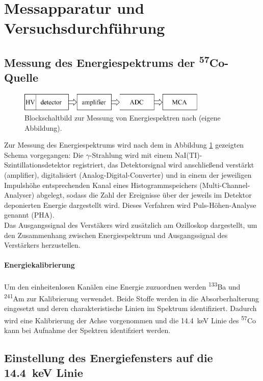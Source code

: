\documentclass[a4paper,twoside,final]{article}
\begin{document}
\section{Messapparatur und Versuchsdurchführung} \label{sec:Versuchsdurchführung}
\subsection{Messung des Energiespektrums der \textsuperscript{57}Co-Quelle}
\begin{figure}[htp]
    \centering
    \includegraphics[width=0.8\textwidth]{Schaltungen/Blockschaltbild_Energiespektren.pdf}
    \caption{Blockschaltbild zur Messung von Energiespektren nach \cite{Reisloehner} (eigene Abbildung).}
    \label{fig:BlockEnergiespektren}
\end{figure}
Zur Messung des Energiespektrums wird nach dem in Abbildung \ref{fig:BlockEnergiespektren} gezeigten Schema vorgegangen: Die $\gamma$-Strahlung wird mit einem NaI(TI)-Szintillationsdetektor registriert, das Detektorsignal wird anschließend verstärkt (amplifier), digitalisiert (Analog-Digital-Converter) und in einem der jeweiligen Impulshöhe entsprechenden Kanal eines Histogrammspeichers (Multi-Channel-Analyser) abgelegt, sodass die Zahl der Ereignisse über der jeweils im Detektor deponierten Energie dargestellt wird. Dieses Verfahren wird Puls-Höhen-Analyse genannt (PHA). \\
Das Ausgangssignal des Verstäkers wird zusätzlich am Ozilloskop dargestellt, um den Zusammenhang zwischen Energiespektrum und Ausgangssignal des Verstärkers herzustellen.
\paragraph{Energiekalibrierung}
Um den einheitenlosen Kanälen eine Energie zuzuordnen werden \textsuperscript{133}Ba und \textsuperscript{241}Am zur Kalibrierung verwendet. Beide Stoffe werden in die Absorberhalterung eingesetzt und deren charakteristische Linien im Spektrum identifiziert. Dadurch wird eine Kalibrierung der Achse vorgenommen und die \SI{14,4}{\kilo\electronvolt} Linie des \textsuperscript{57}Co kann bei Aufnahme der Spektren identifziert werden.
\newpage
\subsection{Einstellung des Energiefensters auf die \SI{14,4}{\kilo\electronvolt} Linie}\label{sec:Energiefenster}
\end{document}
